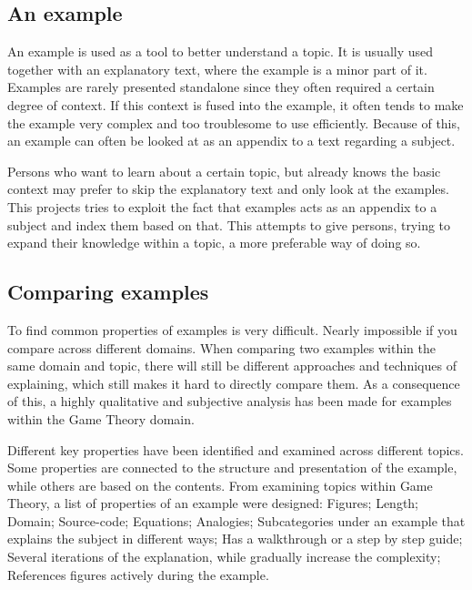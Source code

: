 \subsection{An example}

An example is used as a tool to better understand a topic. It is usually used together with an explanatory text, where the example is a minor part of it. Examples are rarely presented standalone since they often required a certain degree of context. If this context is fused into the example, it often tends to make the example very complex and too troublesome to use efficiently. Because of this, an example can often be looked at as an appendix to a text regarding a subject. 


Persons who want to learn about a certain topic, but already knows the basic context may prefer to skip the explanatory text and only look at the examples. This projects tries to exploit the fact that examples acts as an appendix to a subject and index them based on that. This attempts to give persons, trying to expand their knowledge within a topic, a more preferable way of doing so.

\subsection{Comparing examples} \label{comparing_examples}

To find common properties of examples is very difficult. Nearly impossible if you compare across different domains. When comparing two examples within the same domain and topic, there will still be different approaches and techniques of explaining, which still makes it hard to directly compare them. As a consequence of this, a highly qualitative and subjective analysis has been made for examples within the Game Theory domain. 

Different key properties have been identified and examined across different topics. Some properties are connected to the structure and presentation of the example, while others are based on the contents. From examining topics within Game Theory, a list of properties of an example were designed: Figures; Length; Domain; Source-code; Equations; Analogies; Subcategories under an example that explains the subject in different ways; Has a walkthrough or a step by step guide; Several iterations of the explanation, while gradually increase the complexity; References figures actively during the example.



